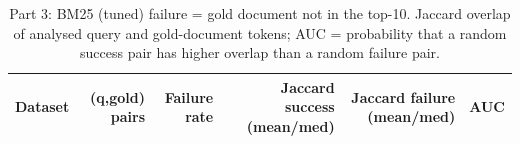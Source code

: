 \begin{table}[ht]\centering\small
\begin{tabular}{lrrrrr}\toprule
Dataset & (q,gold) pairs & Failure rate & Jaccard success (mean/med) & Jaccard failure (mean/med) & AUC \\ \midrule

\bottomrule\end{tabular}
\caption{Part 3: BM25 (tuned) failure = gold document not in the top-10.  Jaccard overlap of analysed query and gold-document tokens; AUC = probability that a random success pair has higher overlap than a random failure pair.}\label{tab:p3stats}\end{table}
